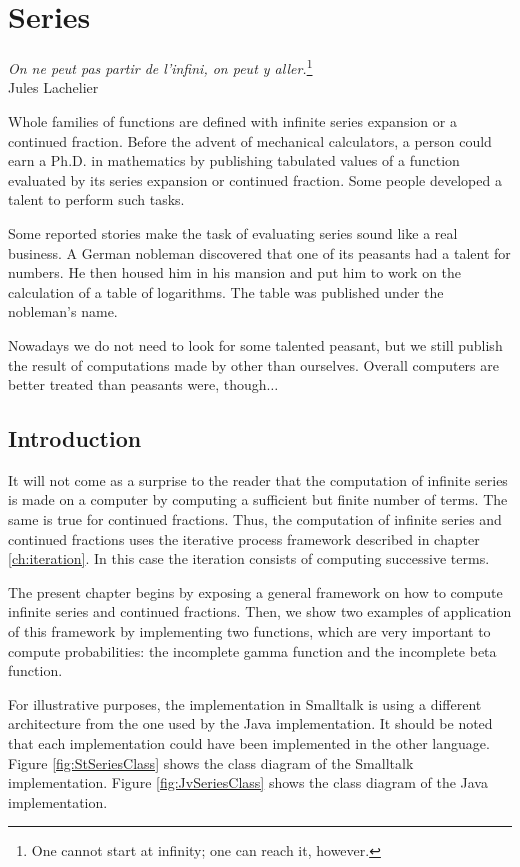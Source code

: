\documentclass[twoside]{book}
\begin{document}
\fi

\chapter{Series}
\label{ch:series}
\begin{flushright}
{\sl On ne peut pas partir de l'infini, on peut y
aller.}\footnote{One cannot start at infinity; one can reach it,
however.}\\ Jules Lachelier
\end{flushright}
\vspace{1 ex} Whole families of functions are defined with
infinite series expansion or a continued fraction. Before the
advent of mechanical calculators, a person could earn a Ph.D. in
mathematics by publishing tabulated values of a function evaluated
by its series expansion or continued fraction. Some people
developed a talent to perform such tasks.

Some reported stories make the task of evaluating series sound
like a real business. A German nobleman discovered that one of its
peasants had a talent for numbers. He then housed him in his
mansion and put him to work on the calculation of a table of
logarithms. The table was published under the nobleman's
name\cite{Ifrah}.

Nowadays we do not need to look for some talented peasant, but we
still publish the result of computations made by other than
ourselves. Overall computers are better treated than peasants
were, though$\ldots$

\section{Introduction}
It will not come as a surprise to the reader that the computation
of infinite series is made on a computer by computing a sufficient
but finite number of terms. The same is true for continued
fractions. Thus, the computation of infinite series and continued
fractions uses the iterative process framework described in
chapter \ref{ch:iteration}. In this case the iteration consists of
computing successive terms.

The present chapter begins by exposing a general framework on how
to compute infinite series and continued fractions. Then, we show
two examples of application of this framework by implementing two
functions, which are very important to compute probabilities: the
incomplete gamma function and the incomplete beta function.

For illustrative purposes, the implementation in Smalltalk is
using a different architecture from the one used by the Java
implementation. It should be noted that each implementation could
have been implemented in the other language. Figure
\ref{fig:StSeriesClass} shows the class diagram of the Smalltalk
implementation. Figure \ref{fig:JvSeriesClass} shows the class
diagram of the Java implementation.
\end{document}

